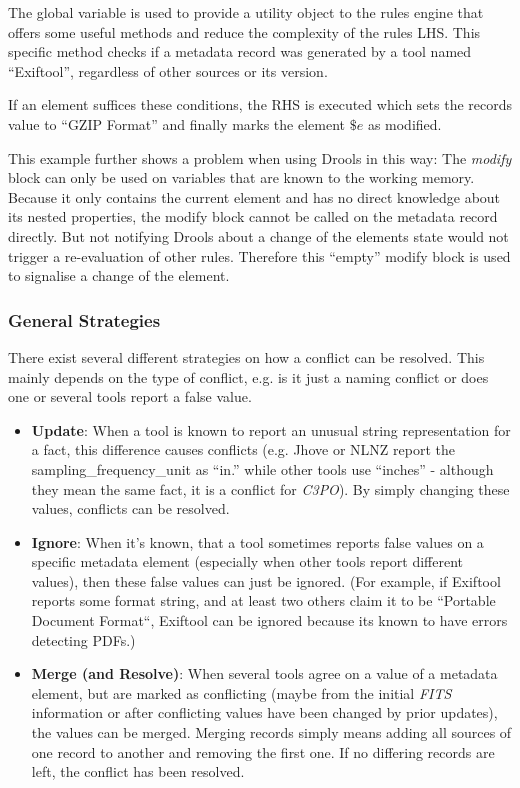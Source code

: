 \documentclass[a4paper,12pt]{article}
\begin{document}
The global variable is used to provide a utility object to the rules engine that offers some useful methods and reduce the complexity of the rules LHS. This specific method checks if a metadata record was generated by a tool named ``Exiftool'', regardless of other sources or its version.

If an element suffices these conditions, the RHS is executed which sets the records value to ``GZIP Format'' and finally marks the element $\$e$ as modified. 

This example further shows a problem when using Drools in this way: The \emph{modify} block can only be used on variables that are known to the working memory. Because it only contains the current element and has no direct knowledge about its nested properties, the modify block cannot be called on the metadata record directly. But not notifying Drools about a change of the elements state would not trigger a re-evaluation of other rules. Therefore this ``empty'' modify block is used to signalise a change of the element.

\subsubsection{General Strategies}

There exist several different strategies on how a conflict can be resolved. This mainly depends on the type of conflict, e.g. is it just a naming conflict or does one or several tools report a false value.

\begin{itemize}
\item \textbf{Update}: When a tool is known to report an unusual string representation for a fact, this difference causes conflicts (e.g. Jhove or NLNZ report the sampling\_frequency\_unit as ``in.'' while other tools use ``inches'' - although they mean the same fact, it is a conflict for \emph{C3PO}). By simply changing these values, conflicts can be resolved.
\item \textbf{Ignore}: When it's known, that a tool sometimes reports false values on a specific metadata element (especially when other tools report different values), then these false values can just be ignored. (For example, if Exiftool reports some format string, and at least two others claim it to be ``Portable Document Format``, Exiftool can be ignored because its known to have errors detecting PDFs.)
\item \textbf{Merge (and Resolve)}: When several tools agree on a value of a metadata element, but are marked as conflicting (maybe from the initial \emph{FITS} information or after conflicting values have been changed by prior updates), the values can be merged. Merging records simply means adding all sources of one record to another and removing the first one. If no differing records are left, the conflict has been resolved.

\end{itemize}
\end{document}
